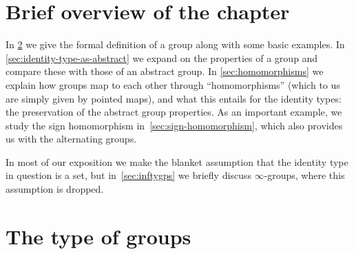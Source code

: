 \section{Brief overview of the chapter}
In \cref{sec:typegroup} we give the formal definition of a group 
along with some basic examples.
In \cref{sec:identity-type-as-abstract} we expand on the properties of a group
and compare these with those of an abstract group.
In \cref{sec:homomorphisms} we explain how groups map to each other through
``homomorphisms'' (which to us are simply given by pointed maps),
and what this entails for the identity types:
the preservation of the abstract group properties.
As an important example, we study the sign homomorphism
in~\cref{sec:sign-homomorphism}, which also provides us with the
alternating groups.

In most of our exposition we make the blanket assumption that the identity type in question is a set, but in~\cref{sec:inftygps} we briefly discuss $\infty$-groups, where this assumption is dropped.

%

\section{The type of groups}
\label{sec:typegroup}


